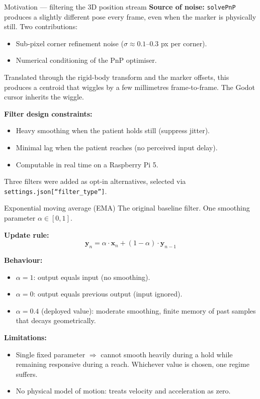 \documentclass[10pt,aspectratio=169]{beamer}
\begin{document}
\begin{frame}{Motivation --- filtering the 3D position stream}
\textbf{Source of noise:} \texttt{solvePnP} produces a slightly different pose every frame, even when the marker is physically still. Two contributions:
\begin{itemize}
    \item Sub-pixel corner refinement noise ($\sigma \approx 0.1$--$0.3$ px per corner).
    \item Numerical conditioning of the PnP optimiser.
\end{itemize}

Translated through the rigid-body transform and the marker offsets, this produces a centroid that wiggles by a few millimetres frame-to-frame. The Godot cursor inherits the wiggle.

\textbf{Filter design constraints:}
\begin{itemize}
    \item Heavy smoothing when the patient holds still (suppress jitter).
    \item Minimal lag when the patient reaches (no perceived input delay).
    \item Computable in real time on a Raspberry Pi 5.
\end{itemize}

Three filters were added as opt-in alternatives, selected via \texttt{settings.json[``filter\_type'']}.
\end{frame}

\begin{frame}{Exponential moving average (EMA)}
The original baseline filter. One smoothing parameter $\alpha \in [0, 1]$.

\textbf{Update rule:}
\[
\mathbf{y}_n = \alpha \cdot \mathbf{x}_n + (1 - \alpha) \cdot \mathbf{y}_{n-1}
\]

\textbf{Behaviour:}
\begin{itemize}
    \item $\alpha = 1$: output equals input (no smoothing).
    \item $\alpha = 0$: output equals previous output (input ignored).
    \item $\alpha = 0.4$ (deployed value): moderate smoothing, finite memory of past samples that decays geometrically.
\end{itemize}

\textbf{Limitations:}
\begin{itemize}
    \item Single fixed parameter $\Rightarrow$ cannot smooth heavily during a hold while remaining responsive during a reach. Whichever value is chosen, one regime suffers.
    \item No physical model of motion: treats velocity and acceleration as zero.
\end{itemize}
\end{frame}
\end{document}
